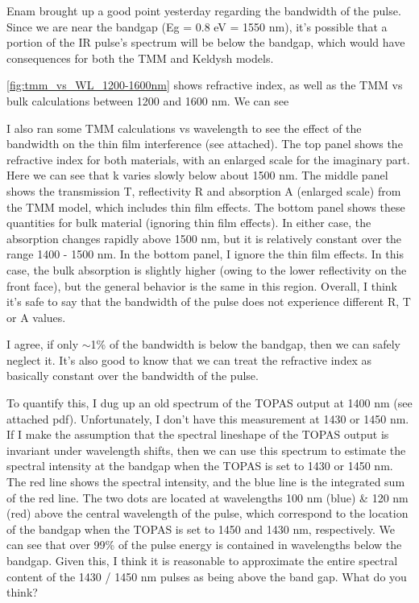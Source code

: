 Enam brought up a good point yesterday regarding the bandwidth of the pulse. Since we are near the bandgap (Eg = 0.8 eV = 1550 nm), it's possible that a portion of the IR pulse's spectrum will be below the bandgap, which would have consequences for both the TMM and Keldysh models.

\cref{fig:tmm_vs_WL_1200-1600nm} shows refractive index, as well as the TMM vs bulk calculations between 1200 and 1600 nm. We can see

I also ran some TMM calculations vs wavelength to see the effect of the bandwidth on the thin film interference (see attached). The top panel shows the refractive index for both materials, with an enlarged scale for the imaginary part. Here we can see that k varies slowly below about 1500 nm. The middle panel shows the transmission T, reflectivity R and absorption A (enlarged scale) from the TMM model, which includes thin film effects. The bottom panel shows these quantities for bulk material (ignoring thin film effects). In either case, the absorption changes rapidly above 1500 nm, but it is relatively constant over the range 1400 - 1500 nm. In the bottom panel, I ignore the thin film effects. In this case, the bulk absorption is slightly higher (owing to the lower reflectivity on the front face), but the general behavior is the same in this region. Overall, I think it's safe to say that the bandwidth of the pulse does not experience different R, T or A values.

I agree, if only $\sim$1\% of the bandwidth is below the bandgap, then we can safely neglect it. It's also good to know that we can treat the refractive index as basically constant over the bandwidth of the pulse.


To quantify this, I dug up an old spectrum of the TOPAS output at 1400 nm (see attached pdf). Unfortunately, I don't have this measurement at 1430 or 1450 nm. If I make the assumption that the spectral lineshape of the TOPAS output is invariant under wavelength shifts, then we can use this spectrum to estimate the spectral intensity at the bandgap when the TOPAS is set to 1430 or 1450 nm. The red line shows the spectral intensity, and the blue line is the integrated sum of the red line. The two dots are located at wavelengths 100 nm (blue) \& 120 nm (red) above the central wavelength of the pulse, which correspond to the location of the bandgap when the TOPAS is set to 1450 and 1430 nm, respectively. We can see that over 99\% of the pulse energy is contained in wavelengths below the bandgap. Given this, I think it is reasonable to approximate the entire spectral content of the 1430 / 1450 nm pulses as being above the band gap. What do you think?


